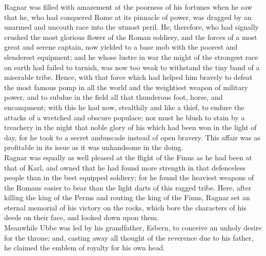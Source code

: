 \documentclass[10pt,a4paper]{report}
\begin{document}
Ragnar was filled with amazement at the poorness of his fortunes when he saw that he, who had conquered Rome at its pinnacle of power, was dragged by an unarmed and uncouth race into the utmost peril. He, therefore, who had signally crushed the most glorious flower of the Roman soldiery, and the forces of a most great and serene captain, now yielded to a base mob with the poorest and slenderest equipment; and he whose lustre in war the might of the strongest race on earth had failed to tarnish, was now too weak to withstand the tiny band of a miserable tribe. Hence, with that force which had helped him bravely to defeat the most famous pomp in all the world and the weightiest weapon of military power, and to subdue in the field all that thunderous foot, horse, and encampment; with this he had now, stealthily and like a thief, to endure the attacks of a wretched and obscure populace; nor must he blush to stain by a treachery in the night that noble glory of his which had been won in the light of day, for he took to a secret ambuscade instead of open bravery. This affair was as profitable in its issue as it was unhandsome in the doing.\\

Ragnar was equally as well pleased at the flight of the Finns as he had been at that of Karl, and owned that he had found more strength in that defenceless people than in the best equipped soldiery; for he found the heaviest weapons of the Romans easier to bear than the light darts of this ragged tribe. Here, after killing the king of the Perms and routing the king of the Finns, Ragnar set an eternal memorial of his victory on the rocks, which bore the characters of his deeds on their face, and looked down upon them.\\

Meanwhile Ubbe was led by his grandfather, Esbern, to conceive an unholy desire for the throne; and, casting away all thought of the reverence due to his father, he claimed the emblem of royalty for his own head.\\
\end{document}
